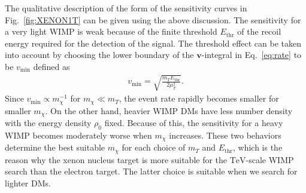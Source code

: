 \documentclass[12pt,twoside,book]{article}
\begin{document}
The qualitative description of the form of the sensitivity curves in Fig.~\ref{fig:XENON1T} can be given using the above discussion.
The sensitivity for a very light WIMP is weak because of the finite threshold $E_{\mathrm{thr}}$ of the recoil energy required for the detection of the signal.
The threshold effect can be taken into account by choosing the lower boundary of the $\bm{v}$-integral in Eq.~\eqref{eq:rate} to be $v_{\mathrm{min}}$ defined as
\begin{align}
  v_{\mathrm{min}} = \sqrt{\frac{m_T E_{\mathrm{thr}}}{2 \mu_T^2}}.
\end{align}
Since $v_{\mathrm{min}} \propto m_\chi^{-1}$ for $m_\chi \ll m_T$, the event rate rapidly becomes smaller for smaller $m_\chi$.
On the other hand, heavier WIMP DMs have less number density with the energy density $\rho_0$ fixed.
Because of this, the sensitivity for a heavy WIMP becomes moderately worse when $m_\chi$ increases.
These two behaviors determine the best suitable $m_\chi$ for each choice of $m_T$ and $E_{\mathrm{thr}}$, which is the reason why the xenon nucleus target is more suitable for the $\mathrm{TeV}$-scale WIMP search than the electron target.
The latter choice is suitable when we search for lighter DMs.
\end{document}
